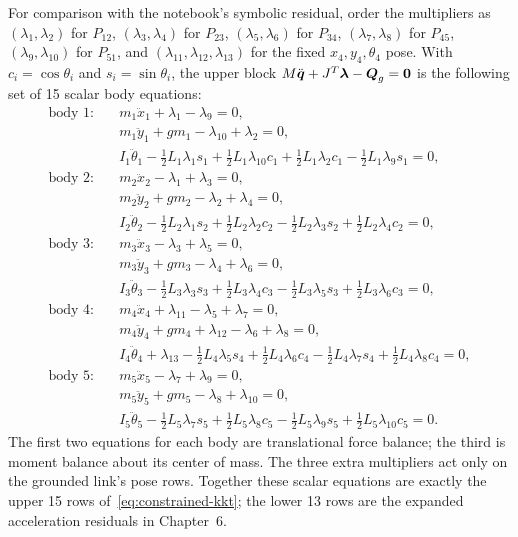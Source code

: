 \documentclass[../main.tex]{subfiles}
\begin{document}
For comparison with the notebook's symbolic residual, order the multipliers as $(\lambda_1,\lambda_2)$ for $P_{12}$, $(\lambda_3,\lambda_4)$ for $P_{23}$, $(\lambda_5,\lambda_6)$ for $P_{34}$, $(\lambda_7,\lambda_8)$ for $P_{45}$, $(\lambda_9,\lambda_{10})$ for $P_{51}$, and $(\lambda_{11},\lambda_{12},\lambda_{13})$ for the fixed $x_4,y_4,\theta_4$ pose. With $c_i=\cos\theta_i$ and $s_i=\sin\theta_i$, the upper block $M\ddot{\boldsymbol{q}}+J^T\boldsymbol{\lambda}-\boldsymbol{Q}_g=\boldsymbol{0}$ is the following set of 15 scalar body equations:
\begin{equation}
\begin{aligned}
\text{body 1:}\quad
&m_1\ddot x_1+\lambda_1-\lambda_9=0,\\
&m_1\ddot y_1+gm_1-\lambda_{10}+\lambda_2=0,\\
&I_1\ddot\theta_1-\tfrac12L_1\lambda_1s_1
+\tfrac12L_1\lambda_{10}c_1+\tfrac12L_1\lambda_2c_1
-\tfrac12L_1\lambda_9s_1=0,\\[2pt]
\text{body 2:}\quad
&m_2\ddot x_2-\lambda_1+\lambda_3=0,\\
&m_2\ddot y_2+gm_2-\lambda_2+\lambda_4=0,\\
&I_2\ddot\theta_2-\tfrac12L_2\lambda_1s_2+\tfrac12L_2\lambda_2c_2
-\tfrac12L_2\lambda_3s_2+\tfrac12L_2\lambda_4c_2=0,\\[2pt]
\text{body 3:}\quad
&m_3\ddot x_3-\lambda_3+\lambda_5=0,\\
&m_3\ddot y_3+gm_3-\lambda_4+\lambda_6=0,\\
&I_3\ddot\theta_3-\tfrac12L_3\lambda_3s_3+\tfrac12L_3\lambda_4c_3
-\tfrac12L_3\lambda_5s_3+\tfrac12L_3\lambda_6c_3=0,\\[2pt]
\text{body 4:}\quad
&m_4\ddot x_4+\lambda_{11}-\lambda_5+\lambda_7=0,\\
&m_4\ddot y_4+gm_4+\lambda_{12}-\lambda_6+\lambda_8=0,\\
&I_4\ddot\theta_4+\lambda_{13}-\tfrac12L_4\lambda_5s_4+\tfrac12L_4\lambda_6c_4
-\tfrac12L_4\lambda_7s_4+\tfrac12L_4\lambda_8c_4=0,\\[2pt]
\text{body 5:}\quad
&m_5\ddot x_5-\lambda_7+\lambda_9=0,\\
&m_5\ddot y_5+gm_5-\lambda_8+\lambda_{10}=0,\\
&I_5\ddot\theta_5-\tfrac12L_5\lambda_7s_5+\tfrac12L_5\lambda_8c_5
-\tfrac12L_5\lambda_9s_5+\tfrac12L_5\lambda_{10}c_5=0.
\end{aligned}
\label{eq:five-link-expanded-force-residuals}
\end{equation}
The first two equations for each body are translational force balance; the third is moment balance about its center of mass. The three extra multipliers act only on the grounded link's pose rows. Together these scalar equations are exactly the upper 15 rows of~\eqref{eq:constrained-kkt}; the lower 13 rows are the expanded acceleration residuals in Chapter~6.
\end{document}
